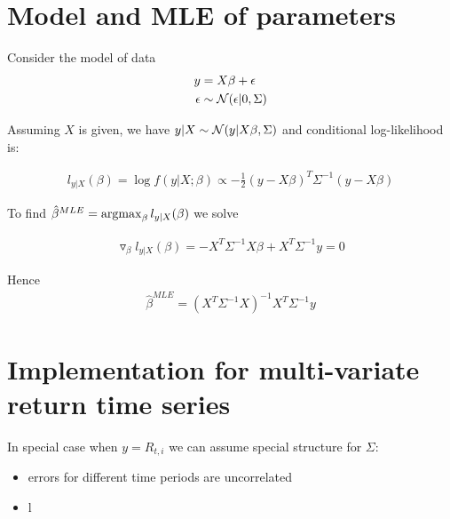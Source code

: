 \section{Model and MLE of parameters}
Consider the model of data
\begin{align}
	y &= X \beta + \epsilon  \\
	\epsilon &\sim \mathcal{N}(\epsilon| 0, \Sigma) \nonumber
\end{align}

Assuming $X$ is given, we have $y|X \sim \mathcal{N}(y| X \beta, \Sigma)$ and conditional log-likelihood is:

\begin{align*}
	l_{y|X}(\beta) = \log f(y|X; \beta) \propto -\frac{1}{2} (y - X\beta)^T \Sigma^{-1} (y - X \beta)
\end{align*}

To find $\hat{\beta}^{MLE} = \operatorname*{argmax}_\beta  l_{y|X}(\beta)$ we solve


\begin{align*}
	\triangledown_{\beta} l_{y|X}(\beta) = - X^T \Sigma^{-1} X \beta + X^T \Sigma^{-1} y = 0
\end{align*}

Hence
\begin{align}
	\hat{\beta}^{MLE} = (X^T \Sigma^{-1} X)^{-1} X^T \Sigma^{-1} y
\end{align}

\section{Implementation for multi-variate return time series}
In special case when $y = R_{t,i}$ we can assume special structure for $\Sigma$:
\begin{itemize}
	\item errors for different time periods are uncorrelated
	\item l
\end{itemize}